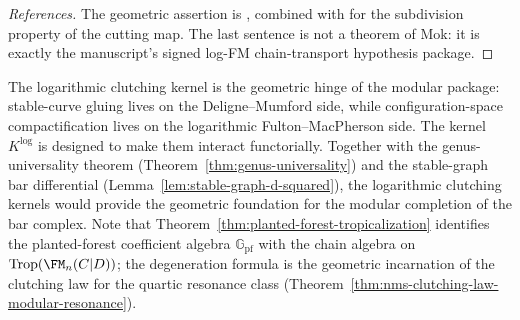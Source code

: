 \begin{proof}[References]
The geometric assertion is \cite[Corollary~5.3.4]{Mok25}, combined
with \cite[Lemma~5.3.1]{Mok25} for the subdivision property of the
cutting map. The last sentence is not a theorem of Mok: it is exactly
the manuscript's signed log-FM chain-transport hypothesis package.
\end{proof}

\begin{remark}%
\label{rem:log-clutching-cohesion}
The logarithmic clutching kernel is the geometric hinge of the
modular package: stable-curve gluing lives on the Deligne--Mumford
side, while configuration-space compactification lives on the
logarithmic Fulton--MacPherson side. The kernel
$K^{\mathrm{log}}$ is designed to make them interact
functorially. Together with the genus-universality theorem
(Theorem~\ref{thm:genus-universality}) and the stable-graph bar
differential (Lemma~\ref{lem:stable-graph-d-squared}), the
logarithmic clutching kernels would provide the geometric
foundation for the modular completion of the bar complex.
Note that Theorem~\ref{thm:planted-forest-tropicalization}
identifies the planted-forest coefficient algebra
$\mathbb{G}_{\mathrm{pf}}$ with the chain algebra on
$\operatorname{Trop}(\FM_n(C|D))$; the degeneration formula
\cite[Corollary~5.3.4]{Mok25} is the geometric incarnation of
the clutching law for the quartic resonance class
(Theorem~\ref{thm:nms-clutching-law-modular-resonance}).
\end{remark}


